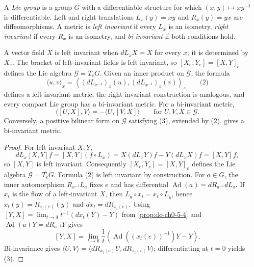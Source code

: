 \begin{example}
  \label{ex:dc-ch1-2-6}


  A \emph{Lie group} is a group $G$ with a differentiable structure for which
  $(x,y)\mapsto xy^{-1}$ is differentiable. Left and right translations
  $L_x(y)=xy$ and $R_x(y)=yx$ are diffeomorphisms. A metric is \emph{left invariant}
  if every $L_x$ is an isometry, \emph{right invariant} if every $R_x$ is an
  isometry, and \emph{bi-invariant} if both conditions hold.

  A vector field $X$ is left invariant when $dL_xX=X$ for every $x$; it is determined
  by $X_e$. The bracket of left-invariant fields is left invariant, so
  $[X_e,Y_e]=[X,Y]_e$ defines the Lie algebra $\mathcal{G}=T_eG$. Given an inner
  product on $\mathcal{G}$, the formula
  $$
  \langle u,v\rangle_x=
  \left\langle(dL_{x^{-1}})_x(u),(dL_{x^{-1}})_x(v)\right\rangle_e
  \qquad\text{(2)}
  $$
  defines a left-invariant metric; the right-invariant construction is analogous,
  and every compact Lie group has a bi-invariant metric. For a bi-invariant metric,
  $$
  \langle[U,X],V\rangle=-\langle U,[V,X]\rangle
  \qquad\text{for }U,V,X\in\mathcal{G}.\tag{3}
  $$
  Conversely, a positive bilinear form on $\mathcal{G}$ satisfying (3), extended
  by (2), gives a bi-invariant metric.
\end{example}
\begin{proof}
  \sketch
  For left-invariant $X,Y$,
  $$
  dL_x[X,Y]f=[X,Y](f\circ L_x)=X(dL_xY)f-Y(dL_xX)f=[X,Y]f,
  $$
  so $[X,Y]$ is left invariant. Consequently $[X_e,Y_e]=[X,Y]_e$ defines the Lie
  algebra $\mathcal{G}=T_eG$. Formula (2) is left invariant by construction.
  For $a\in G$, the inner automorphism $R_{a^{-1}}L_a$ fixes $e$ and has
  differential $\operatorname{Ad}(a)=dR_{a^{-1}}dL_a$. If $x_t$ is the flow of a
  left-invariant $X$, then $L_y\circ x_t=x_t\circ L_y$, hence
  $x_t(y)=R_{x_t(e)}(y)$ and $dx_t=dR_{x_t(e)}$. Using
  $[Y,X]=\lim_{t\to0}t^{-1}(dx_t(Y)-Y)$ from
  \cref{prop:dc-ch0-5-4} and
  $\operatorname{Ad}(a)Y=dR_{a^{-1}}Y$ gives
  $$
  [Y,X]=\lim_{t\to0}\frac{1}{t}
  \left(\operatorname{Ad}((x_t(e))^{-1})Y-Y\right).
  $$
  Bi-invariance gives
  $\langle U,V\rangle=\langle dR_{x_t(e)}U,dR_{x_t(e)}V\rangle$; differentiating at
  $t=0$ yields (3).
\end{proof}

